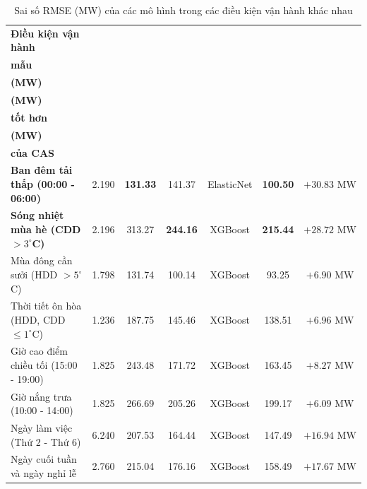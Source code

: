 \begin{table}[H]
\centering
\small
\caption{Sai số RMSE (MW) của các mô hình trong các điều kiện vận hành khác nhau}
\label{tab:regime_errors}
\setlength{\tabcolsep}{3.5pt}
\renewcommand{\arraystretch}{1.15}
\begin{tabularx}{\linewidth}{@{} X c c c c c c @{}}
\toprule
\textbf{Điều kiện vận hành} & \makecell{\textbf{Số}\\\textbf{mẫu}} & \makecell{\textbf{ElasticNet}\\\textbf{(MW)}} & \makecell{\textbf{XGBoost}\\\textbf{(MW)}} & \makecell{\textbf{Mô hình}\\\textbf{tốt hơn}} & \makecell{\textbf{CAS}\\\textbf{(MW)}} & \makecell{\textbf{Mức cải thiện}\\\textbf{của CAS}} \\
\midrule
\textbf{Ban đêm tải thấp (00:00 - 06:00)} & 2.190 & \textbf{131.33} & 141.37 & ElasticNet & \textbf{100.50} & $+30.83\text{ MW}$ \\
\textbf{Sóng nhiệt mùa hè (CDD $> 3^\circ$C)} & 2.196 & 313.27 & \textbf{244.16} & XGBoost & \textbf{215.44} & $+28.72\text{ MW}$ \\
Mùa đông cần sưởi (HDD $> 5^\circ$C) & 1.798 & 131.74 & 100.14 & XGBoost & 93.25 & $+6.90\text{ MW}$ \\
Thời tiết ôn hòa (HDD, CDD $\le 1^\circ$C) & 1.236 & 187.75 & 145.46 & XGBoost & 138.51 & $+6.96\text{ MW}$ \\
Giờ cao điểm chiều tối (15:00 - 19:00) & 1.825 & 243.48 & 171.72 & XGBoost & 163.45 & $+8.27\text{ MW}$ \\
Giờ nắng trưa (10:00 - 14:00) & 1.825 & 266.69 & 205.26 & XGBoost & 199.17 & $+6.09\text{ MW}$ \\
Ngày làm việc (Thứ 2 - Thứ 6) & 6.240 & 207.53 & 164.44 & XGBoost & 147.49 & $+16.94\text{ MW}$ \\
Ngày cuối tuần và ngày nghỉ lễ & 2.760 & 215.04 & 176.16 & XGBoost & 158.49 & $+17.67\text{ MW}$ \\
\bottomrule
\end{tabularx}
\end{table}

